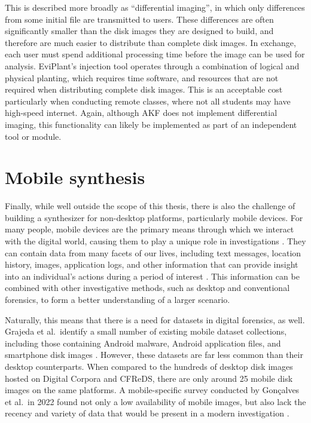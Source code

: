 This is described more broadly as ``differential imaging'', in which
only differences from some initial file are transmitted to users. These
differences are often significantly smaller than the disk images they
are designed to build, and therefore are much easier to distribute than
complete disk images. In exchange, each user must spend additional
processing time before the image can be used for analysis. EviPlant's
injection tool operates through a combination of logical and physical
planting, which requires time software, and resources that are not
required when distributing complete disk images. This is an acceptable
cost particularly when conducting remote classes, where not all students
may have high-speed internet. Again, although AKF does not implement
differential imaging, this functionality can likely be implemented as
part of an independent tool or module.

\section{Mobile synthesis}\label{mobile-synthesis}

Finally, while well outside the scope of this thesis, there is also the
challenge of building a synthesizer for non-desktop platforms,
particularly mobile devices. For many people, mobile devices are the
primary means through which we interact with the digital world, causing
them to play a unique role in investigations
\cite{chernyshevMobileForensicsAdvances2017}. They can contain data
from many facets of our lives, including text messages, location
history, images, application logs, and other information that can
provide insight into an individual's actions during a period of interest
\cite{sutiknoCapabilitiesCellebriteUniversal2024}. This information
can be combined with other investigative methods, such as desktop and
conventional forensics, to form a better understanding of a larger
scenario.

Naturally, this means that there is a need for datasets in digital
forensics, as well. Grajeda et al.~identify a small number of existing
mobile dataset collections, including those containing Android malware,
Android application files, and smartphone disk images
\cite{grajedaAvailabilityDatasetsDigital2017}. However, these
datasets are far less common than their desktop counterparts. When
compared to the hundreds of desktop disk images hosted on Digital
Corpora and CFReDS, there are only around 25 mobile disk images on the
same platforms. A mobile-specific survey conducted by Gonçalves et
al.~in 2022 found not only a low availability of mobile images, but also
lack the recency and variety of data that would be present in a modern
investigation \cite{goncalvesRevisitingDatasetGap2022}.

